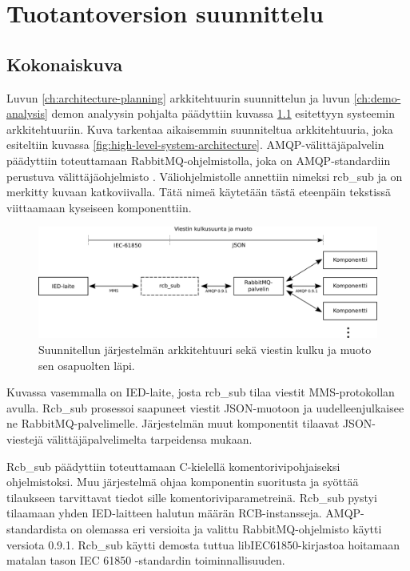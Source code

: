 \chapter{Tuotantoversion suunnittelu}
\label{ch:suunnittelu}


\section{Kokonaiskuva}
Luvun \ref{ch:architecture-planning} arkkitehtuurin suunnittelun ja luvun \ref{ch:demo-analysis} demon analyysin pohjalta päädyttiin kuvassa \ref{fig:planned-system-architecture} esitettyyn systeemin arkkitehtuuriin. Kuva tarkentaa aikaisemmin suunniteltua arkkitehtuuria, joka esiteltiin kuvassa \ref{fig:high-level-system-architecture}. AMQP-välittäjäpalvelin päädyttiin toteuttamaan RabbitMQ-ohjelmistolla, joka on AMQP-stan\-dar\-diin perustuva välittäjäohjelmisto \cite{rabbitmq-homepage}. Väliohjelmistolle annettiin nimeksi rcb\_sub ja on merkitty kuvaan katkoviivalla. Tätä nimeä käytetään tästä eteenpäin tekstissä viittaamaan kyseiseen komponenttiin.


\begin{figure}[ht!]
	\includegraphics[width=1\textwidth]{pictures/planned-system-architecture.png}
	\caption{Suunnitellun järjestelmän arkkitehtuuri sekä viestin kulku ja muoto sen osapuolten läpi.}
	\label{fig:planned-system-architecture}
\end{figure}

Kuvassa vasemmalla on IED-laite, josta rcb\_sub tilaa viestit MMS-protokollan avulla. Rcb\_sub prosessoi saapuneet viestit JSON-muotoon ja uudelleenjulkaisee ne RabbitMQ-palvelimelle. Järjestelmän muut komponentit tilaavat JSON-viestejä välittäjäpalvelimelta tarpeidensa mukaan.

Rcb\_sub päädyttiin toteuttamaan C-kielellä komentorivipohjaiseksi ohjelmistoksi. Muu järjestelmä ohjaa komponentin suoritusta ja syöttää tilaukseen tarvittavat tiedot sille komentoriviparametreinä. Rcb\_sub pystyi tilaamaan yhden IED-laitteen halutun määrän RCB-instansseja. AMQP-stan\-dar\-dis\-ta on olemassa eri versioita ja valittu RabbitMQ-ohjelmisto käytti versiota 0.9.1. Rcb\_sub käytti demosta tuttua libIEC61850-kirjastoa hoitamaan matalan tason IEC 61850 -stan\-dar\-din toiminnallisuuden.

